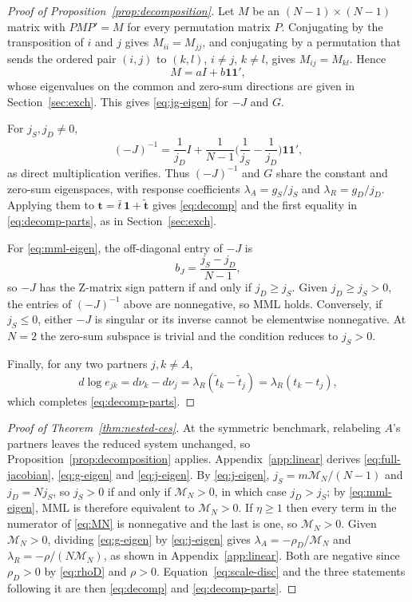 \documentclass[11pt]{article}
\begin{document}
\begin{proof}[Proof of Proposition~\ref{prop:decomposition}]
Let $M$ be an $(N-1)\times(N-1)$ matrix with $PMP'=M$ for every permutation matrix $P$. Conjugating by the transposition of $i$ and $j$ gives $M_{ii}=M_{jj}$, and conjugating by a permutation that sends the ordered pair $(i,j)$ to $(k,l)$, $i\neq j$, $k\neq l$, gives $M_{ij}=M_{kl}$. Hence
\[
M=aI+b\mathbf{1}\mathbf{1}',
\]
whose eigenvalues on the common and zero-sum directions are given in Section~\ref{sec:exch}. This gives \eqref{eq:jg-eigen} for $-J$ and $G$.

For $j_S,j_D\neq0$,
\[
(-J)^{-1} = \frac{1}{j_D}I + \frac{1}{N-1} \Big( \frac{1}{j_S}-\frac{1}{j_D} \Big) \mathbf{1}\mathbf{1}',
\]
as direct multiplication verifies. Thus $(-J)^{-1}$ and $G$ share the constant and zero-sum eigenspaces, with response coefficients $\lambda_A=g_S/j_S$ and $\lambda_R=g_D/j_D$. Applying them to $\mathbf{t}=\bar t\,\mathbf{1}+\widetilde{\mathbf{t}}$ gives \eqref{eq:decomp} and the first equality in \eqref{eq:decomp-parts}, as in Section~\ref{sec:exch}.

For \eqref{eq:mml-eigen}, the off-diagonal entry of $-J$ is
\[
b_J = \frac{j_S-j_D}{N-1},
\]
so $-J$ has the Z-matrix sign pattern if and only if $j_D\geq j_S$. Given $j_D\geq j_S>0$, the entries of $(-J)^{-1}$ above are nonnegative, so MML holds. Conversely, if $j_S\leq0$, either $-J$ is singular or its inverse cannot be elementwise nonnegative. At $N=2$ the zero-sum subspace is trivial and the condition reduces to $j_S>0$.

Finally, for any two partners $j,k\neq A$,
\[
d\log e_{jk} = d\nu_k-d\nu_j = \lambda_R (\tilde t_k-\tilde t_j) = \lambda_R(t_k-t_j),
\]
which completes \eqref{eq:decomp-parts}.
\end{proof}

\begin{proof}[Proof of Theorem~\ref{thm:nested-ces}]
At the symmetric benchmark, relabeling $A$'s partners leaves the reduced system unchanged, so Proposition~\ref{prop:decomposition} applies. Appendix~\ref{app:linear} derives \eqref{eq:full-jacobian}, \eqref{eq:g-eigen} and \eqref{eq:j-eigen}. By \eqref{eq:j-eigen}, $j_S=m\mathcal M_N/(N-1)$ and $j_D=Nj_S$, so $j_S>0$ if and only if $\mathcal M_N>0$, in which case $j_D>j_S$; by \eqref{eq:mml-eigen}, MML is therefore equivalent to $\mathcal M_N>0$. If $\eta\geq1$ then every term in the numerator of \eqref{eq:MN} is nonnegative and the last is one, so $\mathcal M_N>0$. Given $\mathcal M_N>0$, dividing \eqref{eq:g-eigen} by \eqref{eq:j-eigen} gives $\lambda_A=-\rho_D/\mathcal M_N$ and $\lambda_R=-\rho/(N\mathcal M_N)$, as shown in Appendix~\ref{app:linear}. Both are negative since $\rho_D>0$ by \eqref{eq:rhoD} and $\rho>0$. Equation~\eqref{eq:scale-disc} and the three statements following it are then \eqref{eq:decomp} and \eqref{eq:decomp-parts}.
\end{proof}
\end{document}
